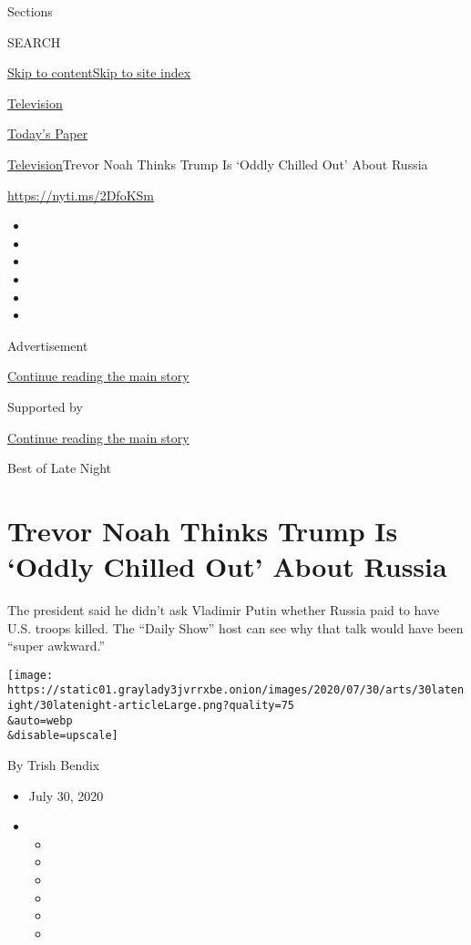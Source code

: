 Sections

SEARCH

\protect\hyperlink{site-content}{Skip to
content}\protect\hyperlink{site-index}{Skip to site index}

\href{https://www.nytimes3xbfgragh.onion/section/arts/television}{Television}

\href{https://myaccount.nytimes3xbfgragh.onion/auth/login?response_type=cookie\&client_id=vi}{}

\href{https://www.nytimes3xbfgragh.onion/section/todayspaper}{Today's
Paper}

\href{/section/arts/television}{Television}\textbar{}Trevor Noah Thinks
Trump Is `Oddly Chilled Out' About Russia

\url{https://nyti.ms/2DfoKSm}

\begin{itemize}
\item
\item
\item
\item
\item
\item
\end{itemize}

Advertisement

\protect\hyperlink{after-top}{Continue reading the main story}

Supported by

\protect\hyperlink{after-sponsor}{Continue reading the main story}

Best of Late Night

\hypertarget{trevor-noah-thinks-trump-is-oddly-chilled-out-about-russia}{%
\section{Trevor Noah Thinks Trump Is `Oddly Chilled Out' About
Russia}\label{trevor-noah-thinks-trump-is-oddly-chilled-out-about-russia}}

The president said he didn't ask Vladimir Putin whether Russia paid to
have U.S. troops killed. The ``Daily Show'' host can see why that talk
would have been ``super awkward.''

\texttt{[image: https://static01.graylady3jvrrxbe.onion/images/2020/07/30/arts/30latenight/30latenight-articleLarge.png?quality=75\\\&auto=webp\\\&disable=upscale]}

By Trish Bendix

\begin{itemize}
\item
  July 30, 2020
\item
  \begin{itemize}
  \item
  \item
  \item
  \item
  \item
  \item
  \end{itemize}
\end{itemize}

